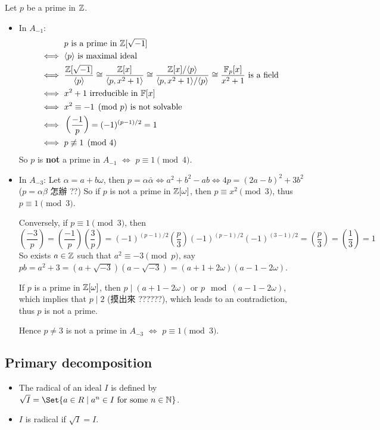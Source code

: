 Let $p$ be a prime in $\mathbb{Z}$.
\begin{itemize}
  \item In $A_{-1}$:
    \begin{align*}
      & p \text{ is a prime in } \mathbb{Z}[\sqrt{-1}] \\
      \iff \ & \langle p\rangle \text{ is maximal ideal } \\
      \iff \ & \frac{\mathbb{Z}[\sqrt{-1}]}{\langle p\rangle} \cong \frac{\mathbb{Z}[x]}{\langle p, x^2+1\rangle}
      \cong \frac{\mathbb{Z}[x]/\langle p\rangle}{\langle p, x^2+1\rangle/\langle p\rangle} \cong \frac{\mathbb{F}_p[x]}{x^2+1}
      \text{ is a field } \\
      \iff \ & x^2 + 1 \text{ irreducible in } \mathbb{F}[x] \\
      \iff \ & x^2 \equiv -1 \pmod{p} \text{ is not solvable } \\
      \iff \ & \left(\frac{-1}{p}\right) = (-1)^{(p-1)/2} = 1 \\
      \iff \ & p \not\equiv 1 \pmod{4}
    \end{align*}
    So $p$ is {\bf not} a prime in $A_{-1}$ $\iff$ $p \equiv 1 \pmod{4}$.
  \item In $A_{-3}$: Let $\alpha = a + b \omega$, then
    $p = \alpha \bar{\alpha} \iff a^2 + b^2 - ab \iff 4p = (2a - b)^2 + 3b^2$
    ($p = \alpha \beta$ 怎辦 ??)
    So if $p$ is not a prime in $\mathbb{Z}[\omega]$, then $p \equiv x^2 \pmod{3}$,
    thus $p \equiv 1 \pmod{3}$.

    Conversely, if $p \equiv 1 \pmod{3}$, then
    \[ \left(\frac{-3}{p}\right)
      = \left(\frac{-1}{p}\right) \left(\frac{3}{p}\right)
      = (-1)^{(p-1)/2} \left(\frac{p}{3}\right) (-1)^{(p-1)/2} (-1)^{(3-1)/2}
      = \left(\frac{p}{3}\right) = \left(\frac{1}{3}\right) = 1 \]
    So exists $a \in \mathbb{Z}$ such that $a^2 \equiv -3 \pmod{p}$,
    say $pb = a^2 + 3 = (a + \sqrt{-3}) (a - \sqrt{-3}) = (a+1 + 2\omega) (a - 1 - 2\omega)$.

    If $p$ is a prime in $\mathbb{Z}[\omega]$, then $p \mid (a+1-2\omega)$ or $p \mod (a - 1 - 2\omega)$,
    which implies that $p \mid 2$ (摸出來 ??????), which leads to an contradiction,
    thus $p$ is not a prime.

    Hence $p \neq 3$ is not a prime in $A_{-3}$ $\iff$ $p \equiv 1 \pmod{3}$.
\end{itemize}


\subsection{Primary decomposition}
\begin{definition} \hfill
  \begin{itemize}
    \item The radical of an ideal $I$ is defined by $\sqrt{I} =
      \Set{ a \in R \mid a^n \in I \text{ for some } n \in \Nb}$.
    \item $I$ is radical if $\sqrt{I} = I$.
  \end{itemize}
\end{definition}

